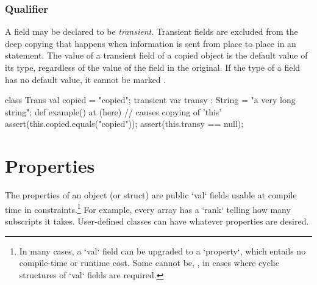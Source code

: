 \subsubsection{ Qualifier}
\label{TransientFields}

A field may be declared to be {\em transient}.  Transient fields are excluded
from the deep copying that happens when information is sent from place to
place in an  statement.    The value of a transient field of a copied
object is the default value of its type, regardless of the value of the field
in the original.  If the type of a field has no
default value, it cannot be marked .


% 
\begin{xten}
class Trans { 
   val copied = "copied";
   transient var transy : String = "a very long string";
   def example() {
      at (here) { // causes copying of 'this'
         assert(this.copied.equals("copied"));
         assert(this.transy == null);
      }
   }
}
\end{xten}


\section{Properties}
\label{PropertiesInClasses}

The properties of an object (or struct) are  public \xcd`val` fields
usable at compile time in constraints.\footnote{In many cases, a 
\xcd`val` field can be upgraded to a \xcd`property`, which 
entails no compile-time or runtime cost.  Some cannot be, \eg, in cases where
cyclic structures of \xcd`val` fields are required.} 
For example,  every array has a \xcd`rank` telling
how many subscripts it takes.  User-defined classes can have whatever
properties are desired. 

